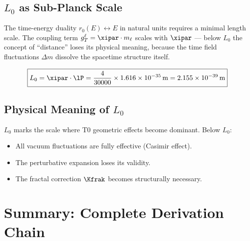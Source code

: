 \subsection{\texorpdfstring{$L_0$}{L0} as Sub-Planck Scale}

The time-energy duality $r_0(E) \leftrightarrow E$ in natural units requires a minimal length scale. The coupling term $g_T^\ell = \xipar \cdot m_\ell$ scales with $\xipar$ — below $L_0$ the concept of ``distance'' loses its physical meaning, because the time field fluctuations $\Delta m$ dissolve the spacetime structure itself.

\begin{keyresult}
\begin{equation}
	\boxed{L_0 = \xipar \cdot \lP = \frac{4}{30000} \times 1{.}616 \times 10^{-35}\,\text{m} = 2{.}155 \times 10^{-39}\,\text{m}}
\end{equation}
\end{keyresult}

\subsection{Physical Meaning of \texorpdfstring{$L_0$}{L0}}

$L_0$ marks the scale where T0 geometric effects become dominant. Below $L_0$:
\begin{itemize}
	\item All vacuum fluctuations are fully effective (Casimir effect).
	\item The perturbative expansion loses its validity.
	\item The fractal correction $\Kfrak$ becomes structurally necessary.
\end{itemize}

\section{Summary: Complete Derivation Chain}

